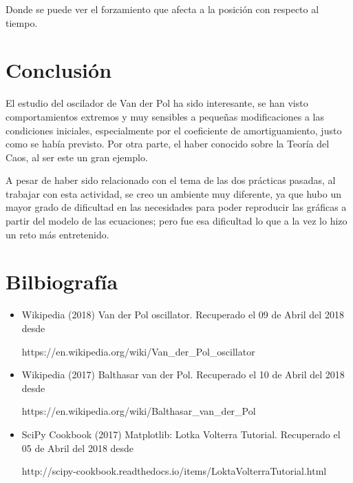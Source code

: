 \documentclass[a4paper]{article}
\begin{document}
Donde se puede ver el forzamiento que afecta a la posición con respecto al tiempo.

\bigskip

\section{Conclusión}
El estudio del oscilador de Van der Pol ha sido interesante, se han visto comportamientos extremos y muy sensibles a pequeñas modificaciones a las condiciones iniciales, especialmente por el coeficiente de amortiguamiento, justo como se había previsto. Por otra parte, el haber conocido sobre la Teoría del Caos, al ser este un gran ejemplo.

A pesar de haber sido relacionado con el tema de las dos prácticas pasadas, al trabajar con esta actividad, se creo un ambiente muy diferente, ya que hubo un mayor grado de dificultad en las necesidades para poder reproducir las gráficas a partir del modelo de las ecuaciones; pero fue esa dificultad lo que a la vez lo hizo un reto más entretenido. 

\pagebreak

\section{Bilbiografía}
\begin{itemize}
\item Wikipedia (2018) Van der Pol oscillator. Recuperado el 09 de Abril del 2018 desde 

https://en.wikipedia.org/wiki/Van\_der\_Pol\_oscillator
\item Wikipedia (2017) Balthasar van der Pol. Recuperado el 10 de Abril del 2018 desde 

https://en.wikipedia.org/wiki/Balthasar\_van\_der\_Pol
\item SciPy Cookbook (2017) Matplotlib: Lotka Volterra Tutorial. Recuperado el 05 de Abril del 2018 desde

http://scipy-cookbook.readthedocs.io/items/LoktaVolterraTutorial.html
\end{itemize}
\end{document}
